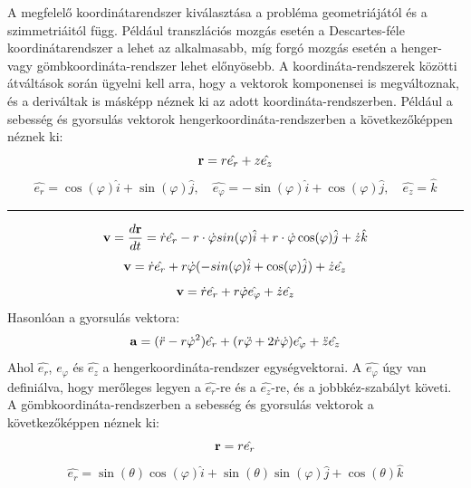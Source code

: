 \documentclass[../main.tex]{subfiles}
\begin{document}
A megfelelő koordinátarendszer kiválasztása a probléma geometriájától és a szimmetriáitól függ. Például transzlációs mozgás esetén a Descartes-féle koordinátarendszer a lehet az alkalmasabb,
míg forgó mozgás esetén a henger- vagy gömbkoordináta-rendszer lehet előnyösebb. A koordináta-rendszerek közötti átváltások során ügyelni kell arra, hogy a vektorok komponensei is megváltoznak,
és a deriváltak is másképp néznek ki az adott koordináta-rendszerben. Például a sebesség és gyorsulás vektorok hengerkoordináta-rendszerben a következőképpen néznek ki: 
\begin{equation}
    \bold{r} = r\hat{e_r} + z\hat{e_z}
\end{equation}
\begin{equation}
     \hat{e_r} = \cos(\varphi)\hat{i} + \sin(\varphi)\hat{j}, \quad \hat{e_\varphi} = -\sin(\varphi)\hat{i} + \cos(\varphi)\hat{j}, \quad \hat{e_z} = \hat{k}
\end{equation}
\noindent\hfil\rule{0.5\textwidth}{.4pt}\hfil
\begin{equation}
    \bold{v} = \frac{d\bold{r}}{dt} = \dot{r}\hat{e_r} - r \cdot \dot{\varphi}sin(\varphi)\hat{i} + r \cdot \dot{\varphi}\cos(\varphi)\hat{j} + \dot{z}\hat{k} 
\end{equation}
\begin{equation}
    \bold{v} = \dot{r}\hat{e_r} + r\dot{\varphi}(- sin(\varphi)\hat{i} + \cos(\varphi)\hat{j}) + \dot{z}\hat{e_z}
\end{equation}
\begin{equation}
    \bold{v} = \dot{r}\hat{e_r} + r\dot{\varphi}\hat{e_\varphi} + \dot{z}\hat{e_z}
\end{equation}
Hasonlóan a gyorsulás vektora: 
\begin{equation}
    \bold{a} = (\ddot{r} - r\dot{\varphi}^2)\hat{e_r} + (r\ddot{\varphi} + 2\dot{r}\dot{\varphi})\hat{e_\varphi} + \ddot{z}\hat{e_z}
\end{equation}
Ahol $\hat{e_r}$, $\hat{e_\varphi}$ és $\hat{e_z}$ a hengerkoordináta-rendszer egységvektorai. A $\hat{e_\varphi}$ úgy van definiálva, hogy merőleges legyen a $\hat{e_r}$-re és a $\hat{e_z}$-re, és a jobbkéz-szabályt követi. 
A gömbkoordináta-rendszerben a sebesség és gyorsulás vektorok a következőképpen néznek ki:
\begin{equation}
    \bold{r} = r\hat{e_r}
\end{equation}
\begin{equation}
     \hat{e_r} = \sin(\theta)\cos(\varphi)\hat{i} + \sin(\theta)\sin(\varphi)\hat{j} + \cos(\theta)\hat{k}
\end{equation}
\end{document}
